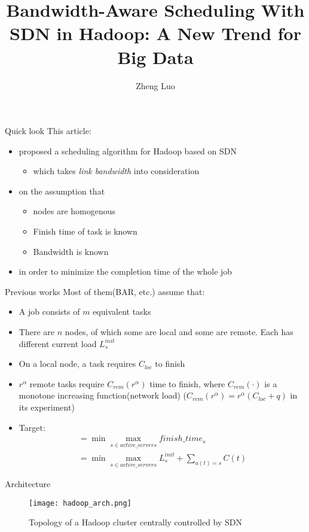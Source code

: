 \documentclass{beamer}
\title{Bandwidth-Aware Scheduling With SDN in Hadoop:
A New Trend for Big Data}
\author{Zheng Luo}
\begin{document}
\begin{frame}
  \titlepage
\end{frame}

\begin{frame}{Quick look}
This article:
\begin{itemize}
    \item proposed a scheduling algorithm for Hadoop based on SDN
        \begin{itemize}
            \item which takes \emph{link bandwidth} into consideration
        \end{itemize}
    \item on the assumption that
        \begin{itemize}
            \item nodes are homogenous
            \item Finish time of task is known
            \item Bandwidth is known
        \end{itemize}
    \item in order to minimize the completion time of the whole job
\end{itemize}
\end{frame}


\begin{frame}{Previous works}
    Most of them(BAR, etc.) assume that:
    \begin{itemize}
        \item A job consists of $m$ equivalent tasks
        \item There are $n$ nodes, of which some are local and some are remote. Each has different current load $L_s^{init}$
        \item On a local node, a task requires $C_{loc}$ to finish
        \item $r^\alpha$ remote tasks require $C_{rem}(r^\alpha)$ time to finish, where $C_{rem}(\cdot )$ is a monotone increasing function(network load) ($C_{rem}(r^\alpha) = r^\alpha (C_{loc} + q)$ in its experiment)
        \item Target:
            \begin{equation}
                \begin{split}
                = \min { \max_{s \in active\_servers}{finish\_time_{s}} } \\
                = \min { \max_{s \in active\_servers} {L_s^{init} + \sum_{a(t) = s}{C(t)} } }
                \end{split}
            \end{equation}
    \end{itemize}
\end{frame}
\begin{frame}{Architecture}
\begin{figure}
    \texttt{[image: hadoop\_arch.png]}
    \caption{Topology of a Hadoop cluster centrally controlled by SDN}
\end{figure}
\end{frame}
\end{document}
